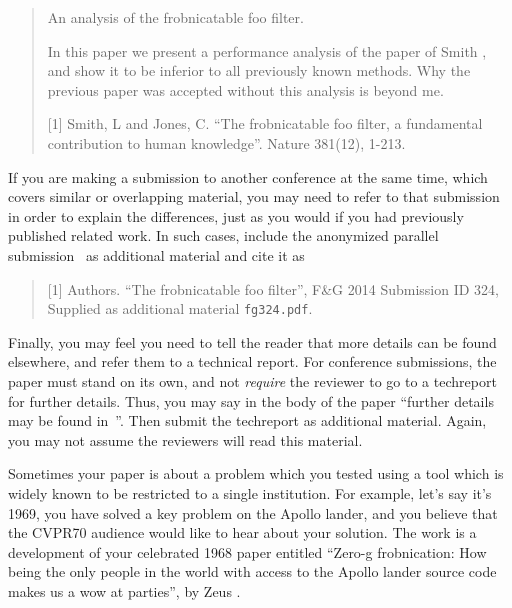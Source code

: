 \documentclass[10pt,twocolumn,letterpaper]{article}
\begin{document}
\begin{quote}
\begin{center}
     An analysis of the frobnicatable foo filter.
\end{center}

   In this paper we present a performance analysis of the paper of Smith \etal
   [1], and show it to be inferior to all previously known methods.  Why the
   previous paper was accepted without this analysis is beyond me.

   [1] Smith, L and Jones, C. ``The frobnicatable foo filter, a fundamental
   contribution to human knowledge''. Nature 381(12), 1-213.
\end{quote}

If you are making a submission to another conference at the same time, which
covers similar or overlapping material, you may need to refer to that submission
in order to explain the differences, just as you would if you had previously
published related work.  In such cases, include the anonymized parallel
submission~\cite{Authors14} as additional material and cite it as
\begin{quote}
[1] Authors. ``The frobnicatable foo filter'', F\&G 2014 Submission ID 324,
Supplied as additional material {\tt fg324.pdf}.
\end{quote}

Finally, you may feel you need to tell the reader that more details can be found
elsewhere, and refer them to a technical report.  For conference submissions,
the paper must stand on its own, and not {\em require} the reviewer to go to a
techreport for further details.  Thus, you may say in the body of the paper
``further details may be found in~\cite{Authors14b}''.  Then submit the
techreport as additional material. Again, you may not assume the reviewers will
read this material.

Sometimes your paper is about a problem which you tested using a tool which is
widely known to be restricted to a single institution.  For example, let's say
it's 1969, you have solved a key problem on the Apollo lander, and you believe
that the CVPR70 audience would like to hear about your solution.  The work is a
development of your celebrated 1968 paper entitled ``Zero-g frobnication: How
being the only people in the world with access to the Apollo lander source code
makes us a wow at parties'', by Zeus \etal.
\end{document}
